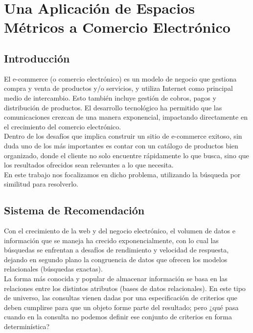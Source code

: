\chapter{Una Aplicaci\'on de Espacios M\'etricos a Comercio Electr\'onico}

\section{Introducci\'on}

El e-commerce (o comercio electr\'onico) es un modelo de negocio que gestiona compra y venta de productos y/o servicios, y utiliza Internet como principal medio de intercambio. Esto tambi\'en incluye gesti\'on de cobros, pagos y distribuci\'on de productos. El desarrollo tecnol\'ogico ha permitido que las comunicaciones crezcan de una manera exponencial, impactando directamente en el crecimiento del comercio electr\'onico.\\

Dentro de los desaf\'ios que implica construir un sitio de e-commerce exitoso, sin duda uno de los m\'as importantes es contar con un cat\'alogo de productos bien organizado, donde el cliente no solo encuentre r\'apidamente lo que busca, sino que los resultados ofrecidos sean relevantes a lo que necesita.\\

En este trabajo nos focalizamos en dicho problema, utilizando la b\'usqueda por similitud para resolverlo.\\

\section{Sistema de Recomendaci\'on}

Con el crecimiento de la web y del negocio electr\'onico, el volumen de datos e informaci\'on que se maneja ha crecido exponencialmente, con lo cual las b\'usquedas se enfrentan a desaf\'ios de rendimiento y velocidad de respuesta, dejando en segundo plano la congruencia de datos que ofrecen los modelos relacionales (b\'usquedas exactas).\\

La forma m\'as conocida y popular de almacenar informaci\'on se basa en las relaciones entre los distintos atributos (bases de datos relacionales). En este tipo de universo, las consultas vienen dadas por una especificaci\'on de criterios que deben cumplirse para que un objeto forme parte del resultado; pero ¿qu\'e pasa cuando en la consulta no podemos definir ese conjunto de criterios en forma determin\'istica?\\

